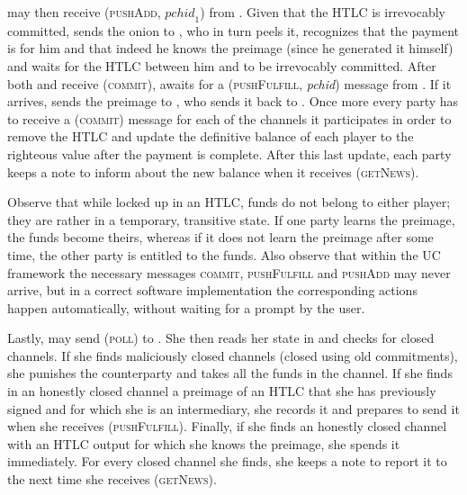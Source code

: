     \bob{} may then receive (\textsc{pushAdd}, $\mathit{pchid}_1$) from
    \environment. Given that the HTLC is irrevocably committed, \bob{} sends the
    onion to \charlie, who in turn peels it, recognizes that the payment is for
    him and that indeed he knows the preimage (since he generated it himself)
    and waits for the HTLC between him and \bob{} to be irrevocably committed.
    After both \bob{} and \charlie{} receive (\textsc{commit}), \charlie{}
    awaits for a (\textsc{pushFulfill}, \textit{pchid}) message from
    \environment. If it arrives, \charlie{} sends the preimage to \bob, who
    sends it back to \alice. Once more every party has to receive a
    (\textsc{commit}) message for each of the channels it participates in order
    to remove the HTLC and update the definitive balance of each player to the
    righteous value after the payment is complete. After this last update, each
    party keeps a note to inform \environment{} about the new balance when it
    receives (\textsc{getNews}).

    Observe that while locked up in an HTLC, funds do not belong to either
    player; they are rather in a temporary, transitive state. If one party
    learns the preimage, the funds become theirs, whereas if it does not learn
    the preimage after some time, the other party is entitled to the funds. Also
    observe that within the UC framework the necessary messages \textsc{commit},
    \textsc{pushFulfill} and \textsc{pushAdd} may never arrive, but in a
    correct software implementation the corresponding actions happen
    automatically, without waiting for a prompt by the user.

    Lastly, \environment{} may send (\textsc{poll}) to \alice. She then reads
    her state in \ledger{} and checks for closed channels. If she finds
    maliciously closed channels (closed using old commitments), she punishes the
    counterparty and takes all the funds in the channel. If she finds in an
    honestly closed channel a preimage of an HTLC that she has previously
    signed and for which she is an intermediary, she records it and prepares to
    send it when she receives (\textsc{pushFulfill}). Finally, if she finds an
    honestly closed channel with an HTLC output for which she knows the
    preimage, she spends it immediately. For every closed channel she finds, she
    keeps a note to report it to \environment{} the next time she receives
    (\textsc{getNews}).

